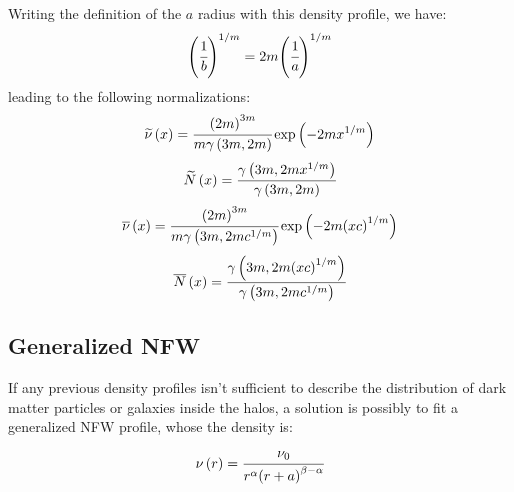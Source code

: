 Writing the definition of the $a$ radius with this density profile, we have:
%
\begin{equation}
    {\left(\cfrac{1}{b}\right)}^{1/m} = 2m{\left(\cfrac{1}{a}\right)}^{1/m}
\end{equation}
%
leading to the following normalizations:
%
\begin{equation}
    \widetilde\nu \left(x\right) = \cfrac{{\left(2m\right)}^{3m}}{m\gamma
    \left(3m, 2m\right)} \exp \left(-2mx^{1/m}\right)
\end{equation}
%
\begin{equation}
    \widetilde{N} \left(x\right) = \cfrac{\gamma \left(3m, 2m
    x^{1/m}\right)}{\gamma \left(3m, 2m\right)}
\end{equation}
%
\begin{equation}
    \overline\nu \left(x\right) = \cfrac{{\left(2m\right)}^{3m}}{m\gamma
    \left(3m, 2m c^{1/m}\right)} \exp \left(-2m{\left(xc\right)}^{1/m}\right)
\end{equation}
%
\begin{equation}
    \overline{N} \left(x\right) = \cfrac{\gamma \left(3m, 2m
        {\left(xc\right)}^{1/m}\right)}{\gamma \left(3m, 2m c^{1/m}\right)}
\end{equation}

\subsection{Generalized NFW}
\label{sub:generalized_nfw}

If any previous density profiles isn't sufficient to describe the
distribution of dark matter particles or galaxies inside the halos, a
solution is possibly to fit a generalized NFW profile, whose the density is:
%
\begin{equation}
    \nu \left(r\right) =
    \cfrac{\nu_0}{r^\alpha{\left(r+a\right)}^{\beta-\alpha}}
\end{equation}

